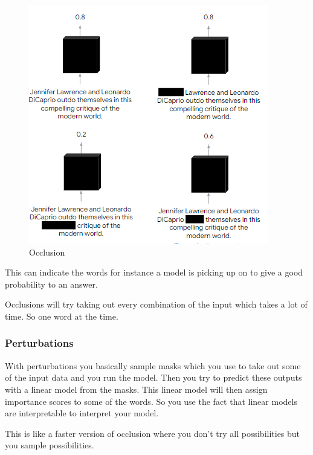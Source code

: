 \documentclass[
  11pt,
  british,
]{article}
\begin{document}
\begin{figure}
\centering
\includegraphics{Pasted_image_20220605012313.png}
\caption{Occlusion}
\end{figure}

This can indicate the words for instance a model is picking up on to
give a good probability to an answer.

Occlusions will try taking out every combination of the input which
takes a lot of time. So one word at the time.

\hypertarget{perturbations}{%
\subsubsection{Perturbations}\label{perturbations}}

With perturbations you basically sample masks which you use to take out
some of the input data and you run the model. Then you try to predict
these outputs with a linear model from the masks. This linear model will
then assign importance scores to some of the words. So you use the fact
that linear models are interpretable to interpret your model.

This is like a faster version of occlusion where you don't try all
possibilities but you sample possibilities.
\end{document}
